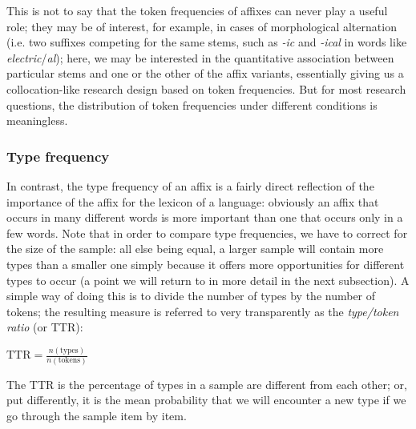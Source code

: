 This is not to say that the token  frequencies  of affixes  can never play a useful role; they may be of interest, for example, in cases of morphological  alternation  (i.e. two suffixes  competing for the same stems,  such as \textit{-ic} and \textit{-ical} in words like \textit{electric}\slash \textit{al}); here, we may be interested in the quantitative association  between particular stems and one or the other of the affix  variants, essentially giving us a collocation\hyp{}like  research design  based on token frequencies.  But for most research questions, the distribution  of token frequencies under different conditions is meaningless.

\subsubsection{Type frequency}
In contrast, the type  frequency  of an affix  is a fairly direct reflection of the importance of the affix  for the lexicon  of a language: obviously an affix  that occurs in many different words is more important than one that occurs only in a few words. Note that in order to compare type frequencies, we have to correct for the size  of the sample: all else being equal, a larger sample will contain more types than a smaller one simply because it offers more opportunities for different types  to occur (a point we will return to in more detail in the next subsection). A simple way of doing this is to divide the number of types by the number of tokens;  the resulting measure is referred to very transparently as the \textit{type\slash token ratio} (or  TTR):

\begin{exe}
\ex $\displaystyle{\text{TTR} = \frac{n \left( \text{types} \right) }{n \left( \text{tokens} \right)}}$
\label{ex:ttrformula}
\end{exe}

The TTR  is the percentage of types  in a sample are different from each other; or, put differently, it is the mean  probability  that we will encounter a new type if we go through the sample item by item.

